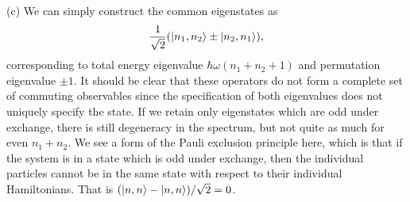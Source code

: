 {(c) We can simply construct the common eigenstates as
\begin{eqnarray}
    \frac{1}{\sqrt{2}} ( \ket{n_1,n_2} \pm \ket{n_2,n_1} )
,\end{eqnarray}
corresponding to total energy eigenvalue $\hbar \omega (n_1 + n_2 + 1)$ and permutation eigenvalue $\pm 1$.
It should be clear that these operators do not form a complete set of commuting observables since the specification of both eigenvalues does not uniquely specify the state.
If we retain only eigenstates which are odd under exchange, there is still degeneracy in the spectrum, but not quite as much for even $n_1 + n_2$.
We see a form of the Pauli exclusion principle here, which is that if the system is in a state which is odd under exchange, then the individual particles cannot be in the same state with respect to their individual Hamiltonians.
That is $( \ket{n,n} - \ket{n,n} )/\sqrt{2} = 0$.

}





